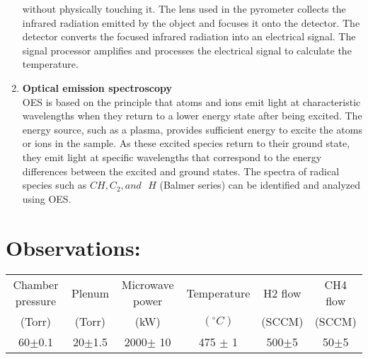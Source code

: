 \documentclass[]{report}[12 pt]
\begin{document}
\begin{enumerate}
		without physically touching it. The lens used in the pyrometer collects the infrared radiation
		emitted by the object and focuses it onto the detector. The detector converts the focused
		infrared radiation into an electrical signal. The signal processor amplifies and processes the
		electrical signal to calculate the temperature.
		\item \textbf{Optical emission spectroscopy}\\
		OES is based on the principle that atoms and ions emit light at characteristic wavelengths
		when they return to a lower energy state after being excited. The energy source, such as a
		plasma, provides sufficient energy to excite the atoms or ions in the sample. As these excited
		species return to their ground state, they emit light at specific wavelengths that correspond to
		the energy differences between the excited and ground states. The spectra of radical species
		such as $CH, C_2 , and \text{ }H$ (Balmer series) can be identified and analyzed using OES.
	\end{enumerate}
	\section*{Observations:}
	\begin{center}
			\begin{tabular}{|c|c|c|c|c|c|}
			\hline
			Chamber pressure& Plenum & Microwave power & Temperature & H2 flow& CH4 flow\\
			(Torr)& (Torr)  & (kW)&$(^{\circ}C)$&(SCCM)&(SCCM)\\
			\hline
			60$\pm$0.1&20$\pm$1.5& 2000$\pm$ 10&475 $\pm$ 1&500$\pm$5 & 50$\pm$5\\
			\hline
		\end{tabular}
	\end{center}
\end{document}
